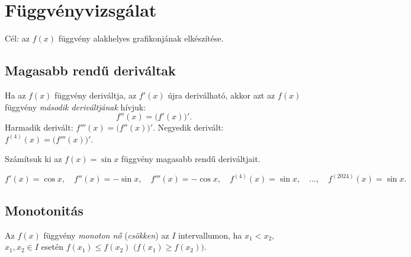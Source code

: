 \documentclass[11pt]{article}
\begin{document}
\section{Függvényvizsgálat}

Cél: az $f(x)$ függvény alakhelyes grafikonjának elkészítése.

\subsection{Magasabb rendű deriváltak}

\begin{defbox}
\begin{definition}
Ha az $f(x)$ függvény deriváltja, az $f'(x)$ újra deriválható, akkor azt az $f(x)$ függvény \emph{második deriváltjának} hívjuk:
\[
f''(x)=\bigl(f'(x)\bigr)'.
\]
Harmadik derivált: $f'''(x)=\bigl(f''(x)\bigr)'$. Negyedik derivált: $f^{(4)}(x)=\bigl(f'''(x)\bigr)'$.
\end{definition}
\end{defbox}

\begin{exbox}
\begin{example}
Számítsuk ki az $f(x)=\sin x$ függvény magasabb rendű deriváltjait.
\end{example}
\end{exbox}
\begin{solution}
\[
f'(x)=\cos x,\quad f''(x)=-\sin x,\quad f'''(x)=-\cos x,\quad f^{(4)}(x)=\sin x,\quad\dots,\quad f^{(2024)}(x)=\sin x .
\]
\end{solution}

\subsection{Monotonitás}

\begin{defbox}
\begin{definition}[Monotonitás]
Az $f(x)$ függvény \emph{monoton nő} (\emph{csökken}) az $I$ intervallumon, ha $x_{1}<x_{2}$, $x_{1}, x_{2}\in I$ esetén $f(x_{1})\le f(x_{2})$ $\bigl(f(x_{1})\ge f(x_{2})\bigr)$.
\end{definition}
\end{defbox}
\end{document}
